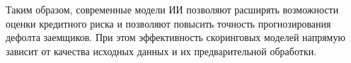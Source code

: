Таким образом, современные модели ИИ позволяют расширять возможности оценки кредитного риска и позволяют повысить точность прогнозирования дефолта заемщиков. При этом эффективность скоринговых моделей напрямую зависит от качества исходных данных и их предварительной обработки.
%	
%	
%	
%	
%	
